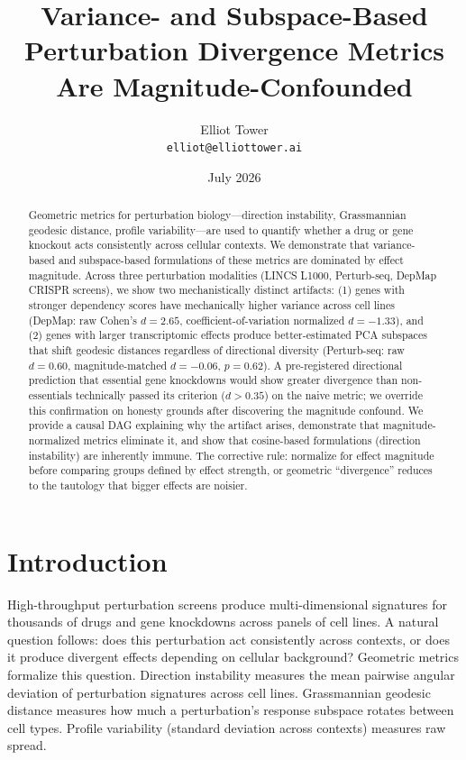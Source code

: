 \documentclass[11pt]{article}
\title{Variance- and Subspace-Based Perturbation Divergence Metrics\\Are Magnitude-Confounded}
\author{Elliot Tower\\
\texttt{elliot@elliottower.ai}}
\date{July 2026}
\begin{document}
\maketitle

\begin{abstract}
Geometric metrics for perturbation biology---direction instability,
Grassmannian geodesic distance, profile variability---are used to
quantify whether a drug or gene knockout acts consistently across
cellular contexts. We demonstrate that variance-based and subspace-based
formulations of these metrics are dominated by effect magnitude. Across
three perturbation modalities (LINCS L1000, Perturb-seq, DepMap CRISPR
screens), we show two mechanistically distinct artifacts: (1) genes with
stronger dependency scores have mechanically higher variance across cell
lines (DepMap: raw Cohen's $d = 2.65$, coefficient-of-variation
normalized $d = -1.33$), and (2) genes with larger transcriptomic
effects produce better-estimated PCA subspaces that shift geodesic
distances regardless of directional diversity (Perturb-seq: raw $d =
0.60$, magnitude-matched $d = -0.06$, $p = 0.62$). A pre-registered
directional prediction that essential gene knockdowns would show greater
divergence than non-essentials technically passed its criterion ($d >
0.35$) on the naive metric; we override this confirmation on honesty
grounds after discovering the magnitude confound. We provide a causal
DAG explaining why the artifact arises, demonstrate that
magnitude-normalized metrics eliminate it, and show that cosine-based
formulations (direction instability) are inherently immune. The
corrective rule: normalize for effect magnitude before comparing groups
defined by effect strength, or geometric ``divergence'' reduces to the
tautology that bigger effects are noisier.
\end{abstract}

\section{Introduction}

High-throughput perturbation screens produce multi-dimensional signatures
for thousands of drugs and gene knockdowns across panels of cell lines.
A natural question follows: does this perturbation act consistently
across contexts, or does it produce divergent effects depending on
cellular background? Geometric metrics formalize this question.
Direction instability measures the mean pairwise angular deviation of
perturbation signatures across cell lines. Grassmannian geodesic
distance measures how much a perturbation's response subspace rotates
between cell types. Profile variability (standard deviation across
contexts) measures raw spread.
\end{document}
